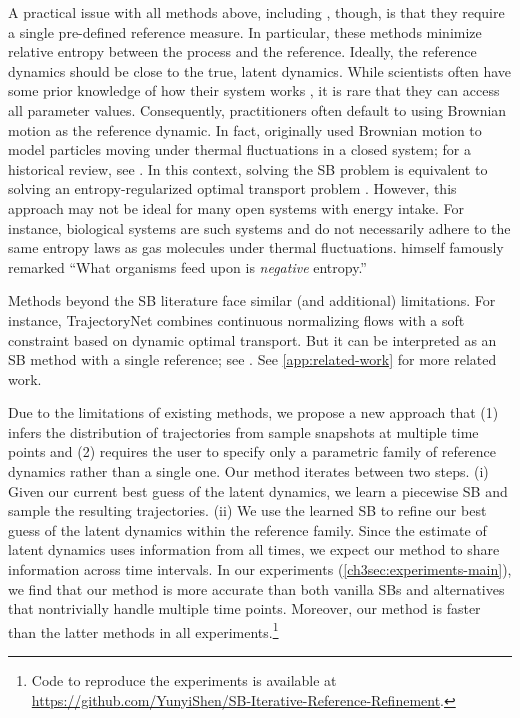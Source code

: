 A practical issue with all methods above, including \citet{chen2024deep}, though, is that they require a single pre-defined reference measure. In particular, these methods minimize relative entropy between the process and the reference. 
Ideally, the reference dynamics should be close to the true, latent dynamics. While scientists often have some prior knowledge of how their system works \citep[e.g., the parametric form of the underlying dynamical model, as in][]{pratapa2020benchmarking}, it is rare that they can access all parameter values. Consequently, practitioners often default to using Brownian motion as the reference dynamic. In fact, \citet{schrodinger1932theorie} originally used Brownian motion to model particles moving under thermal fluctuations in a closed system; for a historical review, see \citet{leonard2013survey}. In this context, solving the SB problem is equivalent to solving an entropy-regularized optimal transport problem \citep{cuturi2013sinkhorn}. However, this approach may not be ideal for many open systems with energy intake. For instance, biological systems are such systems and do not necessarily adhere to the same entropy laws as gas molecules under thermal fluctuations. \citet[][Chapter 6]{schrodinger1946life} himself  famously remarked ``What organisms feed upon is \textit{negative} entropy.''

Methods beyond the SB literature face similar (and additional) limitations. 
For instance, TrajectoryNet \citep{tong2020trajectorynet} combines continuous normalizing flows with a soft constraint based on dynamic optimal transport. But it can be interpreted as an SB method with a single reference;
see \citet[sections 3.2 and 4.1]{tong2020trajectorynet}. See \cref{app:related-work} for more related work. 


Due to the limitations of existing methods, we propose a new approach that (1) infers the distribution of trajectories from sample snapshots at multiple time points and (2) requires the user to specify only a parametric family of reference dynamics rather than a single one. Our method iterates between two steps. (i) Given our current best guess of the latent dynamics, we learn a piecewise SB and sample the resulting trajectories. (ii) We use the learned SB to refine our best guess of the latent dynamics within the reference family. 
Since the estimate of latent dynamics uses information from all times, we expect our method to share information across time intervals.
In our experiments (\cref{ch3sec:experiments-main}), we find that our method is more accurate than both vanilla SBs and alternatives that nontrivially handle multiple time points. %
Moreover, our method is faster than the latter methods in all experiments.\footnote{Code to reproduce the experiments is available at \href{https://github.com/YunyiShen/SB-Iterative-Reference-Refinement}{https://github.com/YunyiShen/SB-Iterative-Reference-Refinement}.} %



